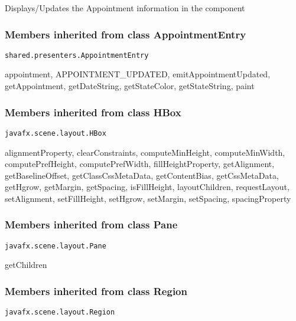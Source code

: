 {{{{{{{{{{{{{{{{\begin{itemize}
{\begin{itemize}
{Displays/Updates the Appointment information in the component
}
\end{itemize}
}%
\end{itemize}
}
\subsubsection{Members inherited from class AppointmentEntry }{
\texttt{shared.presenters.AppointmentEntry} {\small 
{}}
{\small 

appointment, APPOINTMENT\_UPDATED, emitAppointmentUpdated, getAppointment, getDateString, getStateColor, getStateString, paint}
\subsubsection{Members inherited from class HBox }{
\texttt{javafx.scene.layout.HBox} {\small 
{}}
{\small 

alignmentProperty, clearConstraints, computeMinHeight, computeMinWidth, computePrefHeight, computePrefWidth, fillHeightProperty, getAlignment, getBaselineOffset, getClassCssMetaData, getContentBias, getCssMetaData, getHgrow, getMargin, getSpacing, isFillHeight, layoutChildren, requestLayout, setAlignment, setFillHeight, setHgrow, setMargin, setSpacing, spacingProperty}
\subsubsection{Members inherited from class Pane }{
\texttt{javafx.scene.layout.Pane} {\small 
{}}
{\small 

getChildren}
\subsubsection{Members inherited from class Region }{
\texttt{javafx.scene.layout.Region} {\small 
{}}
{\small 

}}}}}}}}}}}}}}}}}}}}
